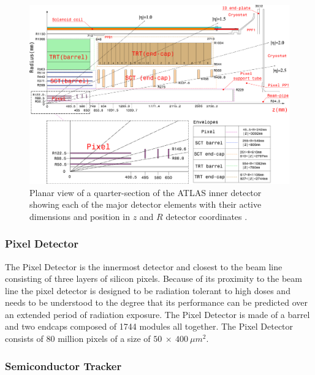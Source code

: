 		\begin{figure}[h!]
			\begin{center}
				\includegraphics[width=0.99\linewidth]{images/FigID26-mod-011107.eps}
			\end{center}
			\caption{Planar view of a quarter-section of the ATLAS inner detector showing each of the major detector elements with their active dimensions and position in $z$ and $R$ detector coordinates \cite{Aad:1129811}.}
			\label{fig:ATLAS_inner_config}
		\end{figure}



		\subsubsection*{Pixel Detector} 

		The Pixel Detector is the innermost detector and closest to the beam line consisting of three layers of silicon pixels. Because of its proximity to the beam line the pixel detector is designed to be radiation tolerant to high doses and needs to be understood to the degree that its performance can be predicted over an extended period of radiation exposure. The Pixel Detector is made of a barrel and two endcaps composed of 1744 modules all together. The Pixel Detector consists of 80 million pixels of a size of $50~\times~400~\mu m^{2}$.


		\subsubsection*{Semiconductor Tracker}

